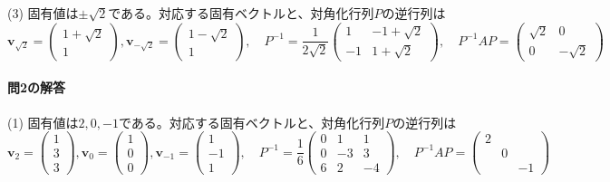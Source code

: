 (3) 固有値は$\pm\sqrt{2}$である。対応する固有ベクトルと、対角化行列$P$の逆行列は
\[
\bm{v}_{\sqrt{2}} = 
\begin{pmatrix}
1 + \sqrt{2} \\
1
\end{pmatrix}, 
\bm{v}_{-\sqrt{2}} = 
\begin{pmatrix}
1 - \sqrt{2} \\
1
\end{pmatrix}, \quad
P^{-1} = 
\frac{1}{2\sqrt{2}}
\begin{pmatrix}
1 & -1 + \sqrt{2} \\
-1 & 1 + \sqrt{2}
\end{pmatrix}, \quad
P^{-1} AP =
\begin{pmatrix}
\sqrt{2} & 0 \\
0 & -\sqrt{2}
\end{pmatrix}
\]

\paragraph{問2の解答}

(1) 固有値は$2, 0, -1$である。対応する固有ベクトルと、対角化行列$P$の逆行列は
\[
\bm{v}_{2} = 
\begin{pmatrix}
1 \\
3 \\
3
\end{pmatrix}, 
\bm{v}_{0} = 
\begin{pmatrix}
1 \\
0 \\
0
\end{pmatrix}, 
\bm{v}_{-1} = 
\begin{pmatrix}
1 \\
-1 \\
1
\end{pmatrix}, \quad
P^{-1} = 
\frac{1}{6}
\begin{pmatrix}
0 & 1 & 1 \\
0 & -3 & 3 \\
6 & 2 & -4
\end{pmatrix}, \quad
P^{-1} AP =
\begin{pmatrix}
2 \\
 & 0 \\
 & & -1
\end{pmatrix}
\]

